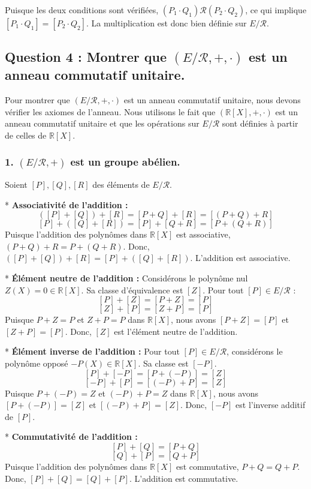 \documentclass{report}
\begin{document}
Puisque les deux conditions sont vérifiées, $(P_1 \cdot Q_1) \mathcal{R} (P_2 \cdot Q_2)$, ce qui implique $[P_1 \cdot Q_1] = [P_2 \cdot Q_2]$.
La multiplication est donc bien définie sur $E/\mathcal{R}$.

\subsection*{Question 4 : Montrer que $(E/\mathcal{R}, +, \cdot)$ est un anneau commutatif unitaire.}

Pour montrer que $(E/\mathcal{R}, +, \cdot)$ est un anneau commutatif unitaire, nous devons vérifier les axiomes de l'anneau. Nous utilisons le fait que $(\mathbb{R}[X], +, \cdot)$ est un anneau commutatif unitaire et que les opérations sur $E/\mathcal{R}$ sont définies à partir de celles de $\mathbb{R}[X]$.

\subsubsection*{1. $(E/\mathcal{R}, +)$ est un groupe abélien.}
Soient $[P], [Q], [R]$ des éléments de $E/\mathcal{R}$.

*   \textbf{Associativité de l'addition :}
    $$([P] + [Q]) + [R] = [P+Q] + [R] = [(P+Q)+R]$$
    $$[P] + ([Q] + [R]) = [P] + [Q+R] = [P+(Q+R)]$$
    Puisque l'addition des polynômes dans $\mathbb{R}[X]$ est associative, $(P+Q)+R = P+(Q+R)$.
    Donc, $([P] + [Q]) + [R] = [P] + ([Q] + [R])$. L'addition est associative.

*   \textbf{Élément neutre de l'addition :}
    Considérons le polynôme nul $Z(X) = 0 \in \mathbb{R}[X]$. Sa classe d'équivalence est $[Z]$.
    Pour tout $[P] \in E/\mathcal{R}$ :
    $$[P] + [Z] = [P+Z] = [P]$$
    $$[Z] + [P] = [Z+P] = [P]$$
    Puisque $P+Z=P$ et $Z+P=P$ dans $\mathbb{R}[X]$, nous avons $[P+Z]=[P]$ et $[Z+P]=[P]$.
    Donc, $[Z]$ est l'élément neutre de l'addition.

*   \textbf{Élément inverse de l'addition :}
    Pour tout $[P] \in E/\mathcal{R}$, considérons le polynôme opposé $-P(X) \in \mathbb{R}[X]$. Sa classe est $[-P]$.
    $$[P] + [-P] = [P+(-P)] = [Z]$$
    $$[-P] + [P] = [(-P)+P] = [Z]$$
    Puisque $P+(-P)=Z$ et $(-P)+P=Z$ dans $\mathbb{R}[X]$, nous avons $[P+(-P)]=[Z]$ et $[(-P)+P]=[Z]$.
    Donc, $[-P]$ est l'inverse additif de $[P]$.

*   \textbf{Commutativité de l'addition :}
    $$[P] + [Q] = [P+Q]$$
    $$[Q] + [P] = [Q+P]$$
    Puisque l'addition des polynômes dans $\mathbb{R}[X]$ est commutative, $P+Q = Q+P$.
    Donc, $[P] + [Q] = [Q] + [P]$. L'addition est commutative.
\end{document}
